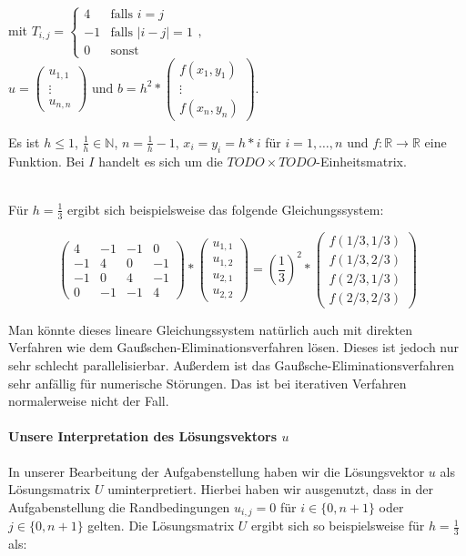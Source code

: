 \documentclass{article}
\begin{document}
mit $T_{i,j} = \begin{cases} 4 & \text{falls } i = j \\ -1 & \text{falls } |i-j| = 1 \\ 0 & \text{sonst}\end{cases}, \quad$ 
$u = \begin{pmatrix}
u_{1,1} \\ 
\vdots \\
u_{n,n}
\end{pmatrix} \text{ und } b = h^2 * \begin{pmatrix}
f(x_1, y_1) \\ 
\vdots \\
f(x_n, y_n)
\end{pmatrix}.$

Es ist $h \leq 1$, $\frac{1}{h} \in \mathbb{N}$, $n = \frac{1}{h}-1$, $x_i = y_i = h*i$ für $i = 1, \ldots, n$ und $f : \mathbb{R} \to \mathbb{R}$ eine Funktion. Bei $I$ handelt es sich um die $TODO \times TODO$-Einheitsmatrix.

~\\

Für $h = \frac{1}{3}$ ergibt sich beispielsweise das folgende Gleichungssystem:

$$\begin{pmatrix}
4 & -1 & -1 & 0 \\ 
-1 & 4 & 0 & -1 \\ 
-1 & 0 & 4 & -1 \\ 
0 & -1 & -1 & 4
\end{pmatrix} *
\begin{pmatrix}
u_{1,1} \\ 
u_{1,2} \\ 
u_{2,1} \\ 
u_{2,2}
\end{pmatrix} = \left(\frac{1}{3}\right)^2 *
\begin{pmatrix}
f(1/3,1/3) \\ 
f(1/3,2/3) \\ 
f(2/3,1/3) \\ 
f(2/3,2/3)
\end{pmatrix}
$$

Man könnte dieses lineare Gleichungssystem natürlich auch mit direkten Verfahren wie dem Gaußschen-Eliminationsverfahren lösen. Dieses ist jedoch nur sehr schlecht parallelisierbar. Außerdem ist das Gaußsche-Eliminationsverfahren sehr anfällig für numerische Störungen. Das ist bei iterativen Verfahren normalerweise nicht der Fall.

\paragraph{Unsere Interpretation des Lösungsvektors $u$}
In unserer Bearbeitung der Aufgabenstellung haben wir die Lösungsvektor $u$ als Lösungsmatrix $U$ uminterpretiert. Hierbei haben wir ausgenutzt, dass in der Aufgabenstellung die Randbedingungen $u_{i,j} = 0$ für $i \in \{0, n+1\}$ oder $j \in \{0, n+1\}$ gelten. Die Lösungsmatrix $U$ ergibt sich so beispielsweise für $h=\frac{1}{3}$ als:
\end{document}
